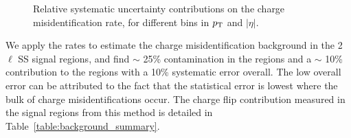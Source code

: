  \begin{figure}[htp!] 
\centering
\setlength{\fboxrule}{0 pt}
% 

% 
\caption{Relative systematic uncertainty contributions on the
      charge misidentification rate, for different bins in $p_{\rm T}$ and 
      $|\eta|$.}\label{figure:background_qmissyst}
 \end{figure}

We apply the rates to estimate the charge misidentification background in the 2$\ell$ SS signal regions, and find  $\sim$ 25\% contamination in the \ee regions and a $\sim$ 10\% contribution to the \emu regions with a 10\% systematic error overall. The low overall error can be attributed to the fact that the statistical error is lowest where the bulk of charge misidentifications occur. The charge flip contribution measured in the signal regions from this method is detailed in Table~\ref{table:background_summary}. 


